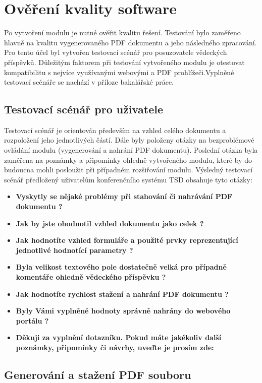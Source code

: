 \chapter{Ověření kvality software}
Po vytvoření modulu je nutné ověřit kvalitu řešení. Testování bylo zaměřeno hlavně na kvalitu vygenerovaného PDF dokumentu a jeho následného zpracování. Pro tento účel byl vytvořen testovací scénář pro posuzovatele vědeckých příspěvků. Důležitým faktorem při testování vytvořeného modulu je otestovat kompatibilitu s nejvíce využívanými webovými a PDF prohlížeči.Vyplněné testovací scénáře se nachází v příloze bakalářské práce.

\section{Testovací scénář pro uživatele}
Testovací scénář je orientován především na vzhled celého dokumentu a rozpoložení jeho jednotlivých částí. Dále byly položeny otázky na bezproblémové ovládání modulu (vygenerování a nahrání PDF dokumentu). Poslední otázka byla zaměřena na poznámky a připomínky ohledně vytvořeného modulu, které by do budoucna mohli posloužit při případném rozšiřování modulu.
Výsledný testovací scénář předložený uživatelům konferenčního systému TSD obsahuje tyto otázky:
\begin{itemize}
	\item \textbf{Vyskytly se nějaké problémy při stahování či nahrávání PDF dokumentu ?}
	\item \textbf{Jak by jste ohodnotil vzhled dokumentu jako celek ?}
	\item \textbf{Jak hodnotíte vzhled formuláře a použité prvky reprezentující jednotlivé hodnotící parametry ?}
	\item \textbf{Byla velikost textového pole dostatečně velká pro případně komentáře ohledně vědeckého příspěvku ?}
	\item \textbf{Jak hodnotíte rychlost stažení a nahrání PDF dokumentu ?} 
	\item \textbf{Byly Vámi vyplněné hodnoty správně nahrány do webového portálu ?}
	\item \textbf{Děkuji za vyplnění dotazníku. Pokud máte jakékoliv další poznámky, připomínky či návrhy, uveďte je prosím zde:}
\end{itemize}

\section{Generování a stažení PDF souboru}

